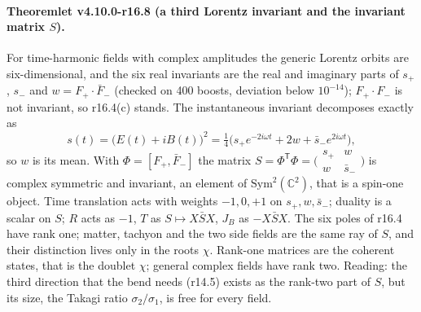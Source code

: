 \paragraph{Theoremlet v4.10.0-r16.8 (a third Lorentz invariant and the invariant matrix \(S\)).}
For time-harmonic fields with complex amplitudes the generic Lorentz orbits are six-dimensional, and the six real invariants
are the real and imaginary parts of \(s_+\), \(s_-\) and \(w=F_+\cdot\bar F_-\) (checked on 400 boosts, deviation below
\(10^{-14}\)); \(F_+\cdot F_-\) is not invariant, so r16.4(c) stands.  The instantaneous invariant decomposes exactly as
\[
s(t)=\bigl(E(t)+iB(t)\bigr)^2=\tfrac14\bigl(s_+e^{-2i\omega t}+2w+\bar s_-e^{2i\omega t}\bigr),
\]
so \(w\) is its mean.  With \(\Phi=[F_+,\bar F_-]\) the matrix \(S=\Phi^{\mathsf T}\Phi=\bigl(\begin{smallmatrix}s_+&w\\w&\bar s_-\end{smallmatrix}\bigr)\)
is complex symmetric and invariant, an element of \(\mathrm{Sym}^2(\mathbb C^2)\), that is a spin-one object.  Time translation acts
with weights \(-1,0,+1\) on \(s_+,w,\bar s_-\); duality is a scalar on \(S\); \(R\) acts as \(-1\), \(T\) as \(S\mapsto X\bar SX\), \(J_B\) as
\(-X\bar SX\).  The six poles of r16.4 have rank one; matter, tachyon and the two side fields are the same ray of \(S\), and
their distinction lives only in the roots \(\chi\).  Rank-one matrices are the coherent states, that is the doublet \(\chi\);
general complex fields have rank two.  Reading: the third direction that the bend needs (r14.5) exists as the rank-two part of
\(S\), but its size, the Takagi ratio \(\sigma_2/\sigma_1\), is free for every field.

